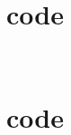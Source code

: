 \documentclass[paper=a4, fontsize=11pt]{scrartcl}
\numberwithin{equation}{section}		%
\numberwithin{figure}{section}			%
\numberwithin{table}{section}				%
\begin{document}
\section*{code}
\begin{lstlisting}


\end{lstlisting}




\section*{code}
\begin{lstlisting}


\end{lstlisting}
\end{document}
